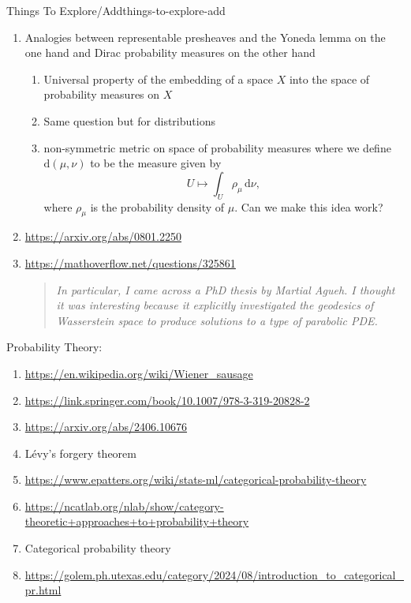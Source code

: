 \begin{remark}{Things To Explore/Add}{things-to-explore-add}
\begin{enumerate}
        \item Analogies between representable presheaves and the Yoneda lemma on the one hand and Dirac probability measures on the other hand
            \begin{enumerate}
                \item Universal property of the embedding of a space $X$ into the space of probability measures on $X$
                \item Same question but for distributions
                \item non-symmetric metric on space of probability measures where we define $\mathrm{d}(\mu,\nu)$ to be the measure given by
                    \[
                        U%
                        \mapsto%
                        \int_{U}\rho_{\mu}\,\mathrm{d}\nu,%
                    \]%
                    where $\rho_{\mu}$ is the probability density of $\mu$. Can we make this idea work?
            \end{enumerate}
        \item \url{https://arxiv.org/abs/0801.2250}
        \item \url{https://mathoverflow.net/questions/325861}
            \begin{quote}
                \textit{In particular, I came across a PhD thesis by Martial Agueh. I thought it was interesting because it explicitly investigated the geodesics of Wasserstein space to produce solutions to a type of parabolic PDE.}
            \end{quote}
    \end{enumerate}
    Probability Theory:
    \begin{enumerate}
        \item \url{https://en.wikipedia.org/wiki/Wiener_sausage}
        \item \href{https://link.springer.com/book/10.1007/978-3-319-20828-2}{https://link.springer.com/book/10.1007/978-3-319-20828-2}
        \item \url{https://arxiv.org/abs/2406.10676}
        \item Lévy's forgery theorem
        \item \url{https://www.epatters.org/wiki/stats-ml/categorical-probability-theory}
        \item \url{https://ncatlab.org/nlab/show/category-theoretic+approaches+to+probability+theory}
        \item Categorical probability theory
        \item \url{https://golem.ph.utexas.edu/category/2024/08/introduction_to_categorical_pr.html}

\end{enumerate}
\end{remark}
